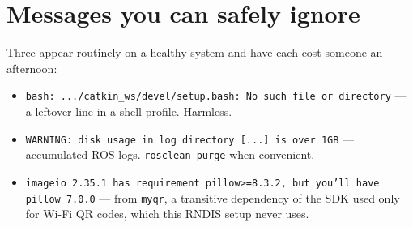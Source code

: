 \documentclass[11pt]{report}
\begin{document}
\section{Messages you can safely ignore}

Three appear routinely on a healthy system and have each cost someone an
afternoon:

\begin{itemize}
  \item \texttt{bash: .../catkin\_ws/devel/setup.bash: No such file or
  directory} --- a leftover line in a shell profile. Harmless.
  \item \texttt{WARNING: disk usage in log directory [...] is over 1GB} ---
  accumulated ROS logs. \texttt{rosclean purge} when convenient.
  \item \texttt{imageio 2.35.1 has requirement pillow>=8.3.2, but you'll
  have pillow 7.0.0} --- from \texttt{myqr}, a transitive dependency of the
  SDK used only for Wi-Fi QR codes, which this RNDIS setup never uses.
\end{itemize}
\end{document}

